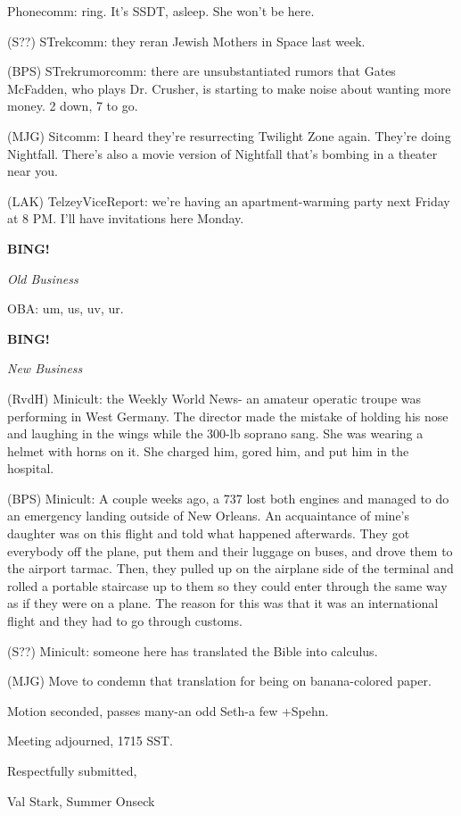 \documentclass[12pt]{article}
\newcommand{\bing}{{\bf BING!} }
\newcommand{\goto}[1]{\bing \vskip 12pt \centerline{{\em{#1}}}}
\begin{document}
Phonecomm: ring. It's SSDT, asleep. She won't be here.

(S??) STrekcomm: they reran Jewish Mothers in Space last week.

(BPS) STrekrumorcomm: there are unsubstantiated rumors that Gates McFadden, who plays Dr. Crusher, is starting to make noise about wanting more money. 2 down, 7 to go.

(MJG) Sitcomm: I heard they're resurrecting Twilight Zone again. They're doing Nightfall. There's also a movie version of Nightfall that's bombing in a theater near you.

(LAK) TelzeyViceReport: we're having an apartment-warming party next Friday at 8 PM. I'll have invitations here Monday.

\goto{Old Business}

OBA: um, us, uv, ur.

\goto{New Business}

(RvdH) Minicult: the Weekly World News- an amateur operatic troupe was performing in West Germany. The director made the mistake of holding his nose and laughing in the wings while the 300-lb soprano sang. She was wearing a helmet with horns on it. She charged him, gored him, and put him in the hospital.

(BPS) Minicult: A couple weeks ago, a 737 lost both engines and managed to do an emergency landing outside of New Orleans. An acquaintance of mine's daughter was on this flight and told what happened afterwards. They got everybody off the plane, put them and their luggage on buses, and drove them to the airport tarmac. Then, they pulled up on the airplane side of the terminal and rolled a portable staircase up to them so they could enter through the same way as if they were on a plane. The reason for this was that it was an international flight and they had to go through customs.

(S??) Minicult: someone here has translated the Bible into calculus.

(MJG) Move to condemn that translation for being on banana-colored paper.

Motion seconded, passes many-an odd Seth-a few +Spehn.

\vspace{12pt}

\noindent
Meeting adjourned, 1715 SST.

\vspace{18pt}

\centerline{Respectfully submitted,}
\centerline{Val Stark, Summer Onseck}
\end{document}
